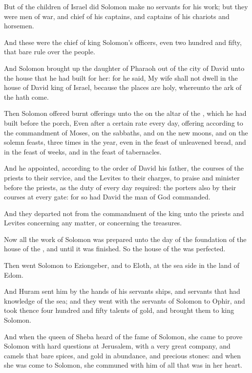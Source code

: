 \Verse But of the children of Israel did Solomon make no servants for his work; but they were men of war, and chief of his captains, and captains of his chariots and horsemen.

\Verse And these were the chief of king Solomon's officers, even two hundred and fifty, that bare rule over the people.

\Verse And Solomon brought up the daughter of Pharaoh out of the city of David unto the house that he had built for her: for he said, My wife shall not dwell in the house of David king of Israel, because the places are holy, whereunto the ark of the \LORD hath come.

\Verse Then Solomon offered burnt offerings unto the \LORD on the altar of the \LORD, which he had built before the porch, \Verse Even after a certain rate every day, offering according to the commandment of Moses, on the sabbaths, and on the new moons, and on the solemn feasts, three times in the year, even in the feast of unleavened bread, and in the feast of weeks, and in the feast of tabernacles.

\Verse And he appointed, according to the order of David his father, the courses of the priests to their service, and the Levites to their charges, to praise and minister before the priests, as the duty of every day required: the porters also by their courses at every gate: for so had David the man of God commanded.

\Verse And they departed not from the commandment of the king unto the priests and Levites concerning any matter, or concerning the treasures.

\Verse Now all the work of Solomon was prepared unto the day of the foundation of the house of the \LORD, and until it was finished. So the house of the \LORD was perfected.

\Verse Then went Solomon to Eziongeber, and to Eloth, at the sea side in the land of Edom.

\Verse And Huram sent him by the hands of his servants ships, and servants that had knowledge of the sea; and they went with the servants of Solomon to Ophir, and took thence four hundred and fifty talents of gold, and brought them to king Solomon.


\Chapter
\Verse And when the queen of Sheba heard of the fame of Solomon, she came to prove Solomon with hard questions at Jerusalem, with a very great company, and camels that bare spices, and gold in abundance, and precious stones: and when she was come to Solomon, she communed with him of all that was in her heart.

